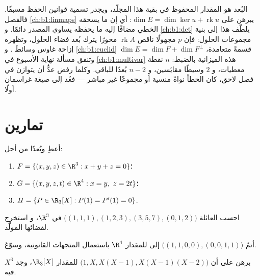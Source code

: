 \begin{remark}
\label{rem:b1:findim:perspectives}
البُعد هو المقدار المحفوظ في بقية هذا المجلّد،
ويجدر تسمية قوانين الحفظ مسبقًا.
فالفصل \cref{ch:b1:linmaps} يبرهن على $\dim E = \dim\ker u +
\operatorname{rk} u$: أي إن ما يسحقه  الخطي مضافًا إليه ما
يحفظه يساوي المصدر دائمًا. و \cref{ch:b1:det} يلطّف هذا
إلى بنية مجموعات الحلول: فإن $p$ مجهولًا ناقص
$\operatorname{rk} A$ محورًا يترك بُعد
فضاء الحلول، وتظهره إزاحة غاوس وسائطَ
. و \cref{ch:b1:euclid}  $\dim E = \dim F + \dim
F^\perp$ قسمةً متعامدة، وتنفق مسألة نهاية الأسبوع في
\cref{ch:b1:multivar} هذه الميزانية بالضبط: $n$ نقطة
معطيات، و $2$ وسيطًا مقايَسين، و $n - 2$ بُعدًا للباقي.
وكلما رفض عدٌّ أن يتوازن في فصل لاحق، كان
الخطأ نواةً منسية أو مجموعًا غير مباشر --- فعُد إلى
صيغة غراسمان أولًا.
\end{remark}

\section{تمارين}

\begin{exercise}[$\star$]\label{exo:b1:findim:1}
أعطِ  وبُعدًا من أجل:
\begin{enumerate}
  \item $F = \{(x,y,z) \in \R^3 : x + y + z = 0\}$؛
  \item $G = \{(x,y,z,t) \in \R^4 : x = y,\ z = 2t\}$؛
  \item $H = \{P \in \R_3[X] : P(1) = P'(1) = 0\}$.
\end{enumerate}
\end{exercise}

\begin{exercise}[$\star$]\label{exo:b1:findim:2}
احسب  العائلة
$\bigl((1,1,1), (1,2,3), (3,5,7), (0,1,2)\bigr)$ في $\R^3$، و
استخرج  لفضائها المولَّد.
\end{exercise}

\begin{exercise}[$\star$]\label{exo:b1:findim:3}
أتمّ  $\bigl((1,1,0,0), (0,0,1,1)\bigr)$ إلى
 للمقدار $\R^4$ باستعمال المتجهات القانونية، وسوّغ.
\end{exercise}

\begin{exercise}[$\star$]\label{exo:b1:findim:4}
برهن على أن $\bigl(1, X, X(X-1), X(X-1)(X-2)\bigr)$  للمقدار
$\R_3[X]$، وجد  $X^3$ فيه.
\end{exercise}

